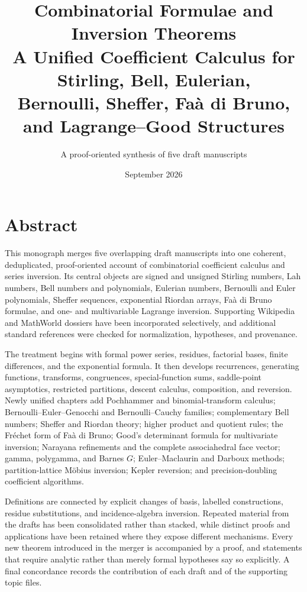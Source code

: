 \documentclass[11pt,a4paper,oneside,openany]{book}
\title{\Huge\bfseries Combinatorial Formulae and Inversion Theorems\\[4mm]
\Large A Unified Coefficient Calculus for Stirling, Bell, Eulerian,\\
Bernoulli, Sheffer, Fa\`a di Bruno, and Lagrange--Good Structures}
\author{A proof-oriented synthesis of five draft manuscripts}
\date{September 2026}
\theoremstyle{definition}
\theoremstyle{remark}
\begin{document}
\frontmatter
\hypersetup{pageanchor=false}
\maketitle
\hypersetup{pageanchor=true}

\chapter*{Abstract}
This monograph merges five overlapping draft manuscripts into one coherent,
deduplicated, proof-oriented account of combinatorial coefficient calculus and
series inversion.  Its central objects are signed and unsigned Stirling numbers,
Lah numbers, Bell numbers and polynomials, Eulerian numbers, Bernoulli and Euler
polynomials, Sheffer sequences, exponential Riordan arrays, Fa\`a di Bruno
formulae, and one- and multivariable Lagrange inversion.  Supporting Wikipedia
and MathWorld dossiers have been incorporated selectively, and additional
standard references were checked for normalization, hypotheses, and provenance.

The treatment begins with formal power series, residues, factorial bases, finite
differences, and the exponential formula.  It then develops recurrences,
generating functions, transforms, congruences, special-function sums, saddle-point
asymptotics, restricted partitions, descent calculus, composition, and reversion.
Newly unified chapters add Pochhammer and binomial-transform calculus;
Bernoulli--Euler--Genocchi and Bernoulli--Cauchy families; complementary Bell
numbers; Sheffer and Riordan theory; higher product and quotient rules; the
Fr\'echet form of Fa\`a di Bruno; Good's determinant formula for multivariate
inversion; Narayana refinements and the complete associahedral face vector;
gamma, polygamma, and Barnes \(G\); Euler--Maclaurin and Darboux methods;
partition-lattice M\"obius inversion; Kepler reversion; and precision-doubling
coefficient algorithms.

Definitions are connected by explicit changes of basis, labelled constructions,
residue substitutions, and incidence-algebra inversion.  Repeated material from
the drafts has been consolidated rather than stacked, while distinct proofs and
applications have been retained where they expose different mechanisms.  Every
new theorem introduced in the merger is accompanied by a proof, and statements
that require analytic rather than merely formal hypotheses say so explicitly.
A final concordance records the contribution of each draft and of the supporting
topic files.
\end{document}
